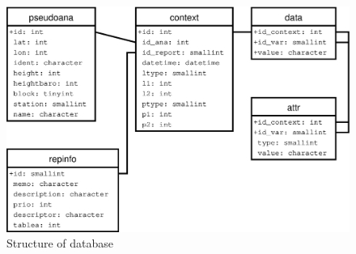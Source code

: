 \begin{figure}
\begin{center}
\includegraphics[width=\textwidth]{db.eps}
\end{center}
\caption{Structure of \dballe{} database}
\end{figure}

